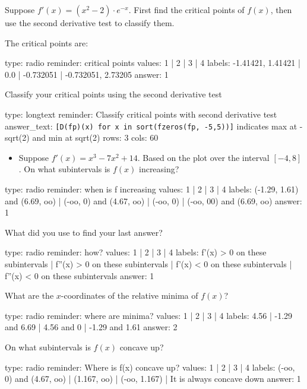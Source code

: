 \documentclass[12pt]{article}
\begin{document}
Suppose $f'(x) = (x^2 - 2) \cdot e^{-x}$. First find the critical points
of $f(x)$, then use the second derivative test to classify them.

The critical points are:

\begin{answer}
type: radio
reminder: critical points
values: 1 | 2 | 3 | 4
labels: -1.41421, 1.41421 | 0.0 | -0.732051 | -0.732051, 2.73205
answer: 1
\end{answer}

Classify your critical points using the second derivative test

\begin{answer}
type: longtext
reminder: Classify critical points with second derivative test
answer_text: \verb+[D(fp)(x) for x in sort(fzeros(fp, -5,5))]+ indicates max at -sqrt(2) and min at sqrt(2) 
rows: 3
cols: 60
\end{answer}

\begin{itemize}
\itemsep1pt\parskip0pt
\item
  Suppose $f'(x) = x^3 - 7x^2 + 14$. Based on the plot over the interval
  $[-4, 8]$. On what subintervals is $f(x)$ increasing?
\end{itemize}

\begin{answer}
type: radio
reminder: when is f increasing
values: 1 | 2 | 3 | 4
labels: (-1.29, 1.61) and (6.69, oo) | (-oo, 0) and (4.67, oo) | (-oo, 0) | (-oo, 00) and (6.69, oo)
answer: 1
\end{answer}

What did you use to find your last answer?

\begin{answer}
type: radio
reminder: how?
values: 1 | 2 | 3 | 4
labels: f'(x) > 0 on these subintervals | f''(x) > 0 on these subintervals | f'(x) < 0 on these subintervals | f''(x) < 0 on these subintervals
answer: 1
\end{answer}

What are the $x$-coordinates of the relative minima of $f(x)$?

\begin{answer}
type: radio
reminder: where are minima?
values: 1 | 2 | 3 | 4
labels: 4.56 | -1.29 and 6.69 | 4.56 and 0 | -1.29 and 1.61
answer: 2
\end{answer}

On what subintervals is $f(x)$ concave up?

\begin{answer}
type: radio
reminder: Where is f(x) concave up?
values: 1 | 2 | 3 | 4
labels: (-oo, 0) and (4.67, oo) | (1.167, oo) | (-oo, 1.167) | It is always concave down
answer: 1
\end{answer}
\end{document}
